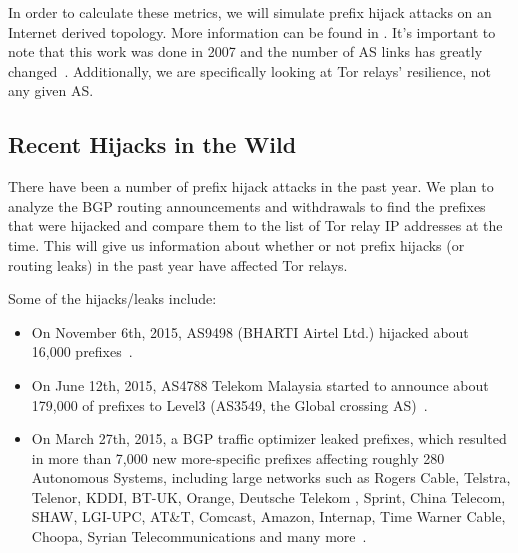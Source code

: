 In order to calculate these metrics, we will simulate prefix hijack attacks on an Internet derived topology.  More information can be found in \cite{lad2007understanding}.  It's important to note that this work was done in 2007 and the number of AS links has greatly changed~\cite{internettopology}.  Additionally, we are specifically looking at Tor relays' resilience, not any given AS. 

\subsection{Recent Hijacks in the Wild}

There have been a number of prefix hijack attacks in the past year.  We plan to analyze the BGP routing announcements and withdrawals to find the prefixes that were hijacked and compare them to the list of Tor relay IP addresses at the time.  This will give us information about whether or not prefix hijacks (or routing leaks) in the past year have affected Tor relays.

Some of the hijacks/leaks include: 

\begin{itemize}
\item On November 6th, 2015, AS9498 (BHARTI Airtel Ltd.) hijacked about 16,000 prefixes~\cite{indiahijack}.
\item On June 12th, 2015, AS4788 Telekom Malaysia started to announce about 179,000 of prefixes to Level3 (AS3549, the Global crossing AS)~\cite{malaysialeak}.
\item On March 27th, 2015, a BGP traffic optimizer leaked prefixes, which resulted in more than 7,000 new more-specific prefixes affecting roughly 280 Autonomous Systems, including large networks such as Rogers Cable, Telstra, Telenor, KDDI, BT-UK, Orange, Deutsche Telekom , Sprint, China Telecom, SHAW, LGI-UPC, AT\&T, Comcast, Amazon, Internap, Time Warner Cable, Choopa, Syrian Telecommunications and many more~\cite{bgpoptimizer}.
\end{itemize}


